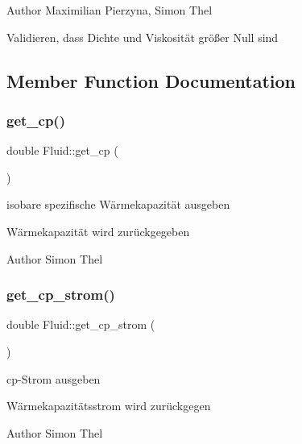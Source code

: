 \begin{DoxyAuthor}{Author}
Maximilian Pierzyna, Simon Thel 
\end{DoxyAuthor}
Validieren, dass Dichte und Viskosität größer Null sind 

\subsection{Member Function Documentation}
\mbox{\label{class_fluid_a86bf10785c4c5822eabf9245f0b39ae0}} 
\subsubsection{\texorpdfstring{get\+\_\+cp()}{get\_cp()}}
{\footnotesize\ttfamily double Fluid\+::get\+\_\+cp (\begin{DoxyParamCaption}{ }\end{DoxyParamCaption})}



isobare spezifische Wärmekapazität ausgeben 

Wärmekapazität wird zurückgegeben \begin{DoxyAuthor}{Author}
Simon Thel 
\end{DoxyAuthor}
\mbox{\label{class_fluid_a5c589565d1bde26bc83125e3e8939796}} 
\subsubsection{\texorpdfstring{get\+\_\+cp\+\_\+strom()}{get\_cp\_strom()}}
{\footnotesize\ttfamily double Fluid\+::get\+\_\+cp\+\_\+strom (\begin{DoxyParamCaption}{ }\end{DoxyParamCaption})}



cp-\/\+Strom ausgeben 

Wärmekapazitätsstrom wird zurückgegen \begin{DoxyAuthor}{Author}
Simon Thel 
\end{DoxyAuthor}
\mbox{\label{class_fluid_acb9e3346c0871ad5fefc9d11dcfc3283}} 
